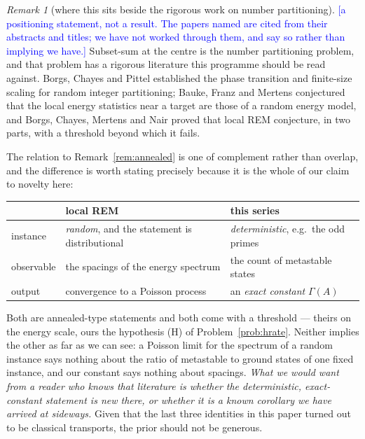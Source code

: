 \documentclass[11pt,a4paper]{article}
\theoremstyle{plain}
\theoremstyle{definition}
\theoremstyle{remark}
\newtheorem{remark}[theorem]{Remark}
\newcommand{\STATUS}[1]{\textcolor{blue}{\textsf{[#1]}}}
\begin{document}
\begin{remark}[where this sits beside the rigorous work on number partitioning]\label{rem:localrem}
\STATUS{a positioning statement, not a result. The papers named are cited from their
abstracts and titles; we have not worked through them, and say so rather than implying we have.}
Subset-sum at the centre is the number partitioning problem, and that problem has a rigorous
literature this programme should be read against. Borgs, Chayes and Pittel established the phase
transition and finite-size scaling for random integer partitioning; Bauke, Franz and Mertens
conjectured that the local energy statistics near a target are those of a random energy model,
and Borgs, Chayes, Mertens and Nair proved that local REM conjecture, in two parts, with a
threshold beyond which it fails.

The relation to Remark~\ref{rem:annealed} is one of complement rather than overlap, and the
difference is worth stating precisely because it is the whole of our claim to novelty here:
\begin{center}
\begin{tabular}{lll}
\toprule
 & local REM & this series\\
\midrule
instance & \emph{random}, and the statement is distributional & \emph{deterministic}, e.g.\ the odd primes\\
observable & the spacings of the energy spectrum & the count of metastable states\\
output & convergence to a Poisson process & an \emph{exact constant} $\Gamma(A)$\\
\bottomrule
\end{tabular}
\end{center}
\noindent
Both are annealed-type statements and both come with a threshold --- theirs on the energy scale,
ours the hypothesis \textup{(H)} of Problem~\ref{prob:hrate}. Neither implies the other as far as
we can see: a Poisson limit for the spectrum of a random instance says nothing about the ratio of
metastable to ground states of one fixed instance, and our constant says nothing about spacings.
\emph{What we would want from a reader who knows that literature is whether the deterministic,
exact-constant statement is new there, or whether it is a known corollary we have arrived at
sideways.} Given that the last three identities in this paper turned out to be classical
transports, the prior should not be generous.
\end{remark}
\end{document}
